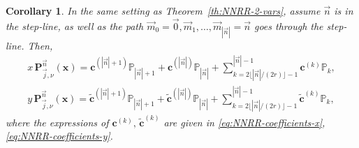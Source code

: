 \documentclass[a4paper]{article}
\theoremstyle{plain}
\newtheorem{corollary}[theorem]{Corollary}
\theoremstyle{definition}
\begin{document}
    \begin{corollary}
        In the same setting as Theorem~\ref{th:NNRR-2-vars}, assume $\vec n$ is in the step-line, as well as the path $\vec m_0=\vec 0, \vec m_1,\dots,\vec m_{|\vec n|}=\vec n$ goes through the step-line. Then,
        \begin{equation}
        \label{eq:NNR-stepline}
            \begin{aligned}
                x\, \mathbf P_{\vec j,\nu}^{\vec n}(\mathbf x) = \mathbf c^{(|\vec n|+1)}\mathbb P_{|\vec n|+1} + \mathbf c^{(|\vec n|)}\mathbb P_{|\vec n|} +  \sum_{k=2\lfloor |\vec n|/(2r)\rfloor-1}^{|\vec n|-1}\mathbf c^{(k)}\mathbb P_{k}, \\
                y\, \mathbf P_{\vec j,\nu}^{\vec n}(\mathbf x) = \tilde{\mathbf c}^{(|\vec n|+1)}\mathbb P_{|\vec n|+1} + \tilde{\mathbf c}^{(|\vec n|)}\mathbb P_{|\vec n|} +  \sum_{k=2\lfloor |\vec n|/(2r)\rfloor-1}^{|\vec n|-1}\tilde{\mathbf c}^{(k)}\mathbb P_{k}, 
            \end{aligned}
        \end{equation}
        where the expressions of $\mathbf c^{(k)},\,\tilde{\mathbf c}^{(k)}$ are given in \eqref{eq:NNRR-coefficients-x}, \eqref{eq:NNRR-coefficients-y}.
        
        
    \end{corollary}
\end{document}
